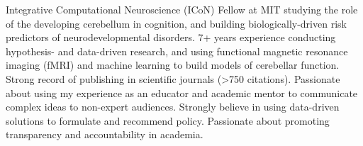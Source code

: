 

\begin{cvparagraph}

Integrative Computational Neuroscience (ICoN) Fellow at MIT studying the role of the developing cerebellum in cognition, and building biologically-driven risk predictors of neurodevelopmental disorders. 7+ years experience conducting hypothesis- and data-driven research, and using functional magnetic resonance imaging (fMRI) and machine learning to build models of cerebellar function. Strong record of publishing in scientific journals (>750 citations). Passionate about using my experience as an educator and academic mentor to communicate complex ideas to non-expert audiences. Strongly believe in using data-driven solutions to formulate and recommend policy. Passionate about promoting transparency and accountability in academia. 

\end{cvparagraph}
